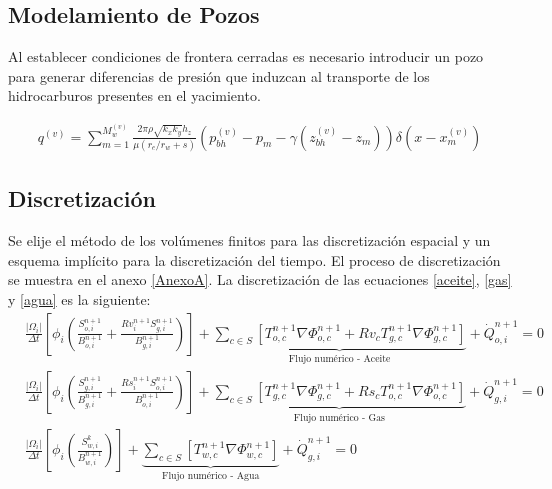 \subsection{Modelamiento de Pozos}
%
Al establecer condiciones de frontera cerradas es necesario introducir un pozo para generar diferencias de presión que induzcan al transporte de los hidrocarburos presentes en el yacimiento.  

\begin{align}
	q^{(v)} = \sum_{m=1}^{M^{(v)}_{w}}\frac{2\pi\rho\sqrt{k_{x}k_{y}}h_{z}}{\mu\left(r_{e}/r_{w} +s\right)}\left(p_{bh}^{(v)}-p_{m}-\gamma\left(z_{bh}^{(v)}-z_{m}\right)\right)\delta\left(x-x_{m}^{(v)}\right)
\end{align}
%
\subsection{Discretización}

Se elije el método de los volúmenes finitos para las discretización espacial y un esquema implícito para la discretización del tiempo. El proceso de discretización se muestra en el anexo \ref{AnexoA}. La discretización de las ecuaciones \ref{aceite}, \ref{gas} y \ref{agua} es la siguiente:
\begin{align}
\label{ec:aceiteDiscretizacion}&\frac{|\Omega_{i}|}{\Delta t}\left[ \phi_{i} \left( \frac{S_{o,i}^{n+1}}{B_{o,i}^{n+1}} + \frac{Rv_{i}^{n+1}S_{g,i}^{n+1}}{B_{g,i}^{n+1}}\right)\right] + 
\underbrace{\sum_{c \in S}\left[ T^{n+1}_{o,c} \nabla{\Phi_{o,c}^{n+1}} + Rv_{c}T^{n+1}_{g,c} \nabla{\Phi_{g,c}^{n+1}} \right] }_{\text{Flujo numérico - Aceite}}+ \dot{Q}_{o,i}^{n+1} = 0 \\
\label{ec:gasDiscretizacion}&\frac{|\Omega_{i}|}{\Delta t}\left[ \phi_{i} \left( \frac{S_{g,i}^{n+1}}{B_{g,i}^{n+1}} + \frac{Rs_{i}^{n+1}S_{o,i}^{n+1}}{B_{o,i}^{n+1}}\right)\right] + 
\underbrace{\sum_{c \in S}\left[ T^{n+1}_{g,c}\nabla{\Phi_{g,c}^{n+1} + Rs_{c}T^{n+1}_{o,c} \nabla{\Phi_{o,c}^{n+1}}} \right] }_{\text{Flujo numérico - Gas}}+ \dot{Q}_{g,i}^{n+1} = 0 \\
\label{ec:aguaDiscretizacion}&\frac{|\Omega_{i}|}{\Delta t}\left[ \phi_{i} \left( \frac{S_{w,i}^{k}}{B_{w,i}^{n+1}}\right)\right]
+ 
\underbrace{\sum_{c \in S}\left[ T^{n+1}_{w,c}\nabla{\Phi_{w,c}^{n+1}} \right]}_{\text{Flujo numérico - Agua}} + \dot{Q}_{g,i}^{n+1} = 0 
\end{align}
